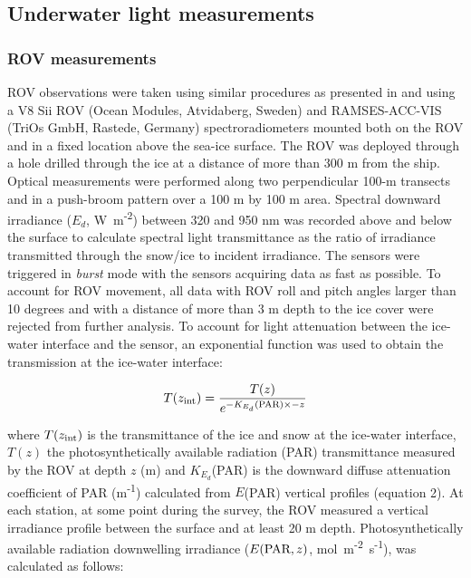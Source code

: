 \documentclass[draft]{agujournal2018}
\newcommand{\ed}{\ensuremath{{E_d}}}
\newcommand{\kdpar}{\ensuremath{K_{E_d}}(\textnormal{PAR})}
\newcommand{\epar}{\ensuremath{E}(\textnormal{PAR})}
\newcommand{\eparz}{\ensuremath{E(\textnormal{PAR}, z)}}
\newcommand{\wmsquare}{W~m\textsuperscript{-2}}
\newcommand{\micromol}{\textmu mol~m\textsuperscript{-2}~s\textsuperscript{-1}}
\begin{document}
\subsection{Underwater light measurements}

\subsubsection{ROV measurements}

ROV observations were taken using similar procedures as presented in \citet{Nicolaus2013} and \citet{Katlein2017} using a V8 Sii ROV (Ocean Modules, Atvidaberg, Sweden) and RAMSES-ACC-VIS (TriOs GmbH, Rastede, Germany) spectroradiometers mounted both on the ROV and in a fixed location above the sea-ice surface. The ROV was deployed through a hole drilled through the ice at a distance of more than 300 m from the ship. Optical measurements were performed along two perpendicular 100-m transects and in a push-broom pattern over a 100 m by 100 m area. Spectral downward irradiance (\ed{}, \wmsquare) between 320 and 950 nm was recorded above and below the surface to calculate spectral light transmittance as the ratio of irradiance transmitted through the snow/ice to incident irradiance. The sensors were triggered in \textit{burst} mode with the sensors acquiring data as fast as possible. To account for ROV movement, all data with ROV roll and pitch angles larger than 10 degrees and with a distance of more than 3 m depth to the ice cover were rejected from further analysis. To account for light attenuation between the ice-water interface and the sensor, an exponential function was used to obtain the transmission at the ice-water interface:

\begin{linenomath*}
	\begin{equation}
		T(z_\textnormal{int}) = \frac{T(z)}{e^{-\kdpar{} \times -z}}
	\end{equation}
\end{linenomath*}

\noindent where $T(z_\textnormal{int})$ is the transmittance of the ice and snow at the ice-water interface, $T(z)$ the photosynthetically available radiation (PAR) transmittance measured by the ROV at depth $z$ (m) and \kdpar{} is the downward diffuse attenuation coefficient of PAR (m\textsuperscript{-1}) calculated from \epar{} vertical profiles (equation 2). At each station, at some point during the survey, the ROV measured a vertical irradiance profile between the surface and at least 20 m depth. Photosynthetically available radiation downwelling irradiance (\eparz{}, \micromol{}), was calculated as follows:
\end{document}
